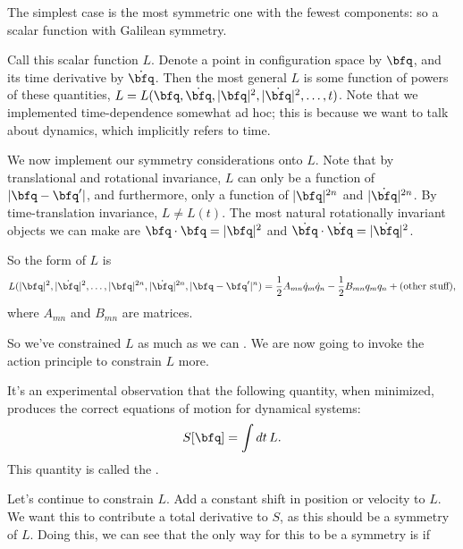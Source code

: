 \documentclass[11pt]{article}
\begin{document}
\begin{reemark}
    The simplest case is the most symmetric one with the fewest
    components: so a scalar function with Galilean symmetry.
\end{reemark}

\begin{iidea}
    Call this scalar function $L$. Denote a point in configuration space
    by $\bfq$, and its time derivative by $\dot{\bfq}$. Then the most
    general $L$ is some function of powers of these quantities, $L = L(\bfq, \dot{\bfq}, |\bfq|^2, |\dot{\bfq}|^2, \ldots, t)$.
    Note that we implemented time-dependence somewhat ad hoc; this is because
    we want to talk about dynamics, which implicitly refers to time.
 
    We now implement our symmetry considerations onto $L$.
    Note that by translational and rotational invariance, $L$ can only
    be a function of $|\bfq - \bfq'|$, and furthermore,
    only a function of $|\bfq|^{2n}$ and $|\dot{\bfq}|^{2n}$. By time-translation
    invariance, $L \neq L(t)$. The most natural rotationally invariant
    objects we can make are $\bfq \cdot \bfq = |\bfq|^2$ and $\dot{\bfq} \cdot \dot{\bfq} = |\dot{\bfq}|^2$.

    So the form of $L$ is
    \begin{align*}
        L(|\bfq|^2, |\dot{\bfq}|^2, \ldots, |\bfq|^{2n}, |\dot{\bfq}|^{2n}, |\bfq - \bfq'|^n) 
        = \frac{1}{2} A_{mn} \dot{q}_m \dot{q}_n - \frac{1}{2} B_{mn} q_m q_n + (\text{other stuff}),
    \end{align*}
    where $A_{mn}$ and $B_{mn}$ are matrices.
\end{iidea}

So we've constrained $L$ as much as we can .
We are now going to invoke the action principle to constrain $L$
more.

\begin{iidea}
    It's an experimental observation that the following quantity,
    when minimized, produces the correct equations of motion for 
    dynamical systems:
    \begin{align*}
        S[\bfq] = \int dt \, L.
    \end{align*}
    This quantity is called the .
\end{iidea}

Let's continue to constrain $L$. Add a constant
shift in position or velocity to $L$. We want this
to contribute a total derivative to $S$, as this should
be a symmetry of $L$. Doing this, we can see that the only
way for this to be a symmetry is if 
\end{document}

